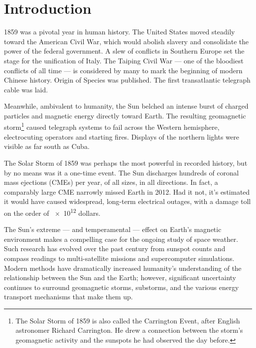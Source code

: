 


\chapter{Introduction}
  \label{ch_intro}



1859 was a pivotal year in human history. The United States moved steadily 
toward the American Civil War, which would abolish slavery and consolidate the 
power of the federal government. A slew of conflicts in Southern Europe set the
stage for the unification of Italy. The Taiping Civil War --- one of the
bloodiest conflicts of all time --- is considered by many to mark the beginning
of modern Chinese history. Origin of Species was published. The first
transatlantic telegraph cable was laid.

Meanwhile, ambivalent to humanity, the Sun belched an intense burst of charged
particles and magnetic energy directly toward Earth. The resulting geomagnetic
storm\footnote{The Solar Storm of 1859 is also called the Carrington Event,
after English astronomer Richard Carrington. He drew a connection between the
storm's geomagnetic activity and the sunspots he had observed the day before.}
caused telegraph systems to fail across the Western hemisphere, electrocuting
operators and starting fires\cite{green_2006,tsurutani_2003}. Displays of the
northern lights were visible as far south as Cuba. 

The Solar Storm of 1859 was perhaps the most powerful in recorded history, but
by no means was it a one-time event. The Sun discharges hundreds of coronal
mass ejections (CMEs) per year, of all sizes, in all directions. In fact, a
comparably large CME narrowly missed Earth in 2012\cite{nasa_2012}. Had it not,
it's estimated it would have caused widespread, long-term electrical outages,
with a damage toll on the order of \num{e12} dollars\cite{lloyds_2013}. 

The Sun's extreme --- and temperamental --- effect on Earth's magnetic
environment makes a compelling case for the ongoing study of space weather.
Such research has evolved over the past century from sunspot counts and compass
readings to multi-satellite missions and supercomputer simulations. Modern
methods have dramatically increased humanity's understanding of the
relationship between the Sun and the Earth; however, significant uncertainty
continues to surround geomagnetic storms, substorms, and the various energy
transport mechanisms that make them up. 

